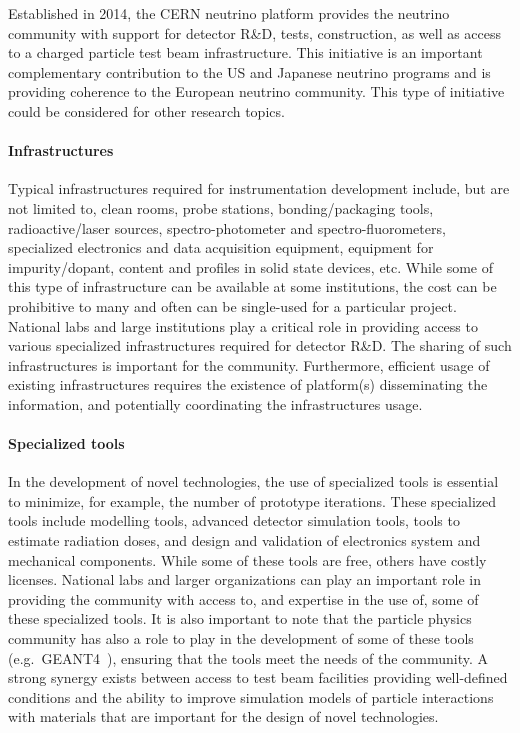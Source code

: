 Established in 2014, the CERN neutrino platform provides the neutrino community with support for detector R\&D, tests, construction, as well as access to a charged particle test beam infrastructure.  This initiative is an important complementary contribution to the US and Japanese neutrino programs and is providing coherence to the European neutrino community.  This type of initiative could be considered for other research topics.
\vfill

\paragraph*{Infrastructures}
Typical infrastructures required for instrumentation development
include, but are not limited to, clean rooms, probe stations,
bonding/packaging tools, radioactive/laser sources, 
spectro-photometer and spectro-fluorometers, specialized electronics and data acquisition equipment, equipment for impurity/dopant, content and profiles in solid 
state devices, etc. While some of this type of infrastructure can be available
at some institutions, the cost can be prohibitive to many and often can be
single-used for a particular project.  National labs and large institutions play a critical role in providing access to various specialized infrastructures required for detector R\&D.  The sharing of such infrastructures 
is important for the community.   Furthermore, efficient usage of existing
infrastructures requires the existence of platform(s) 
disseminating the information, and potentially coordinating the
infrastructures usage.  

\paragraph*{Specialized tools} In the development of novel technologies, the use of specialized tools is
essential to minimize, for example, the number of prototype
iterations.  These specialized tools include modelling tools, advanced
detector simulation tools, tools to estimate radiation doses, and
design and validation of electronics system and mechanical 
components.  While some of these tools are free, others have costly
licenses.  National labs and larger organizations can play an important role in
providing the community with access to, and expertise in the use of, some of these specialized tools.  
It is also important to note that the particle physics community has
also a role to play in the 
development of some of these tools (e.g.\ GEANT4~\cite{bib:geant1,bib:geant2,bib:geant3}), ensuring that the
tools meet the needs of the community.  A strong synergy exists between access to test beam facilities providing well-defined conditions and the ability to improve simulation models of particle interactions with materials that are important for the design of novel technologies. 


